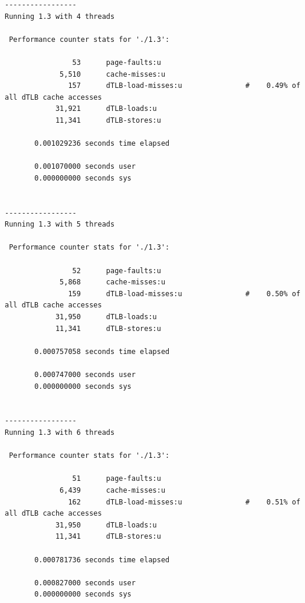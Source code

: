 \documentclass{article}
\begin{document}
\begin{latin}
\begin{lstlisting}
-----------------
Running 1.3 with 4 threads

 Performance counter stats for './1.3':

                53      page-faults:u                                                         
             5,510      cache-misses:u                                                        
               157      dTLB-load-misses:u               #    0.49% of all dTLB cache accesses
            31,921      dTLB-loads:u                                                          
            11,341      dTLB-stores:u                                                         

       0.001029236 seconds time elapsed

       0.001070000 seconds user
       0.000000000 seconds sys


-----------------
Running 1.3 with 5 threads

 Performance counter stats for './1.3':

                52      page-faults:u                                                         
             5,868      cache-misses:u                                                        
               159      dTLB-load-misses:u               #    0.50% of all dTLB cache accesses
            31,950      dTLB-loads:u                                                          
            11,341      dTLB-stores:u                                                         

       0.000757058 seconds time elapsed

       0.000747000 seconds user
       0.000000000 seconds sys


-----------------
Running 1.3 with 6 threads

 Performance counter stats for './1.3':

                51      page-faults:u                                                         
             6,439      cache-misses:u                                                        
               162      dTLB-load-misses:u               #    0.51% of all dTLB cache accesses
            31,950      dTLB-loads:u                                                          
            11,341      dTLB-stores:u                                                         

       0.000781736 seconds time elapsed

       0.000827000 seconds user
       0.000000000 seconds sys



\end{lstlisting}
\end{latin}
\end{document}
